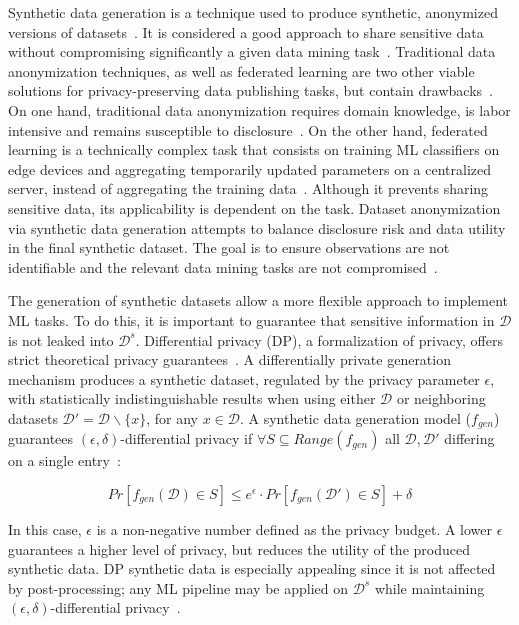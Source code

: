 \documentclass[parskip=full]{scrartcl}
\begin{document}
Synthetic data generation is a technique used to produce synthetic, anonymized
versions of datasets~\cite{dankar2021fake}. It is considered a good approach
to share sensitive data without compromising significantly a given data mining
task~\cite{taub2018differential, park2018data}. Traditional data anonymization
techniques, as well as federated learning are two other viable solutions for
privacy-preserving data publishing tasks, but contain
drawbacks~\cite{hernandez2022synthetic}. On one hand, traditional data
anonymization requires domain knowledge, is labor intensive and remains
susceptible to disclosure~\cite{reiter2004new}. On the other hand, federated
learning is a technically complex task that consists on training ML
classifiers on edge devices and aggregating temporarily updated parameters on
a centralized server, instead of aggregating the training
data~\cite{yu2022survey}. Although it prevents sharing sensitive data, its
applicability is dependent on the task. Dataset anonymization via synthetic
data generation attempts to balance disclosure risk and data utility in the
final synthetic dataset. The goal is to ensure observations are not
identifiable and the relevant data mining tasks are not
compromised~\cite{singh2017aggregating, li2018privacy}.

The generation of synthetic datasets allow a more flexible approach to
implement ML tasks. To do this, it is important to guarantee that sensitive
information in $\mathcal{D}$ is not leaked into $\mathcal{D}^s$. Differential
privacy (DP), a formalization of privacy, offers strict theoretical privacy
guarantees~\cite{rosenblatt2020differentially}. A differentially private
generation mechanism produces a synthetic dataset, regulated by the privacy
parameter $\epsilon$, with statistically indistinguishable results when using
either $\mathcal{D}$ or neighboring datasets $\mathcal{D}' = \mathcal{D}
\backslash \{x\}$, for any $x \in \mathcal{D}$. A synthetic data generation
model ($f_{gen}$) guarantees $(\epsilon, \delta)$-differential privacy if
$\forall S \subseteq Range(f_{gen})$ all $\mathcal{D}, \mathcal{D}'$ differing
on a single entry~\cite{hardt2012simple}:

\begin{equation}
    Pr[f_{gen}(\mathcal{D}) \in S] \le e^{\epsilon} \cdot
    Pr[f_{gen}(\mathcal{D}') \in S] + \delta
\end{equation}
 
In this case, $\epsilon$ is a non-negative number defined as the privacy
budget. A lower $\epsilon$ guarantees a higher level of privacy, but reduces
the utility of the produced synthetic data. DP synthetic data is especially
appealing since it is not affected by post-processing; any ML pipeline may be
applied on $\mathcal{D}^s$ while maintaining $(\epsilon, \delta)$-differential
privacy~\cite{dwork2014algorithmic}.
\end{document}
